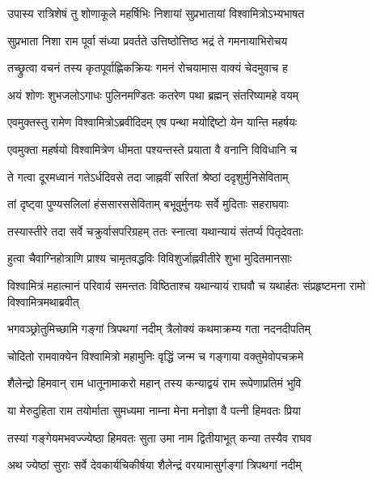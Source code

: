 
\twolineshloka
{उपास्य रात्रिशेषं तु शोणाकूले महर्षिभिः}
{निशायां सुप्रभातायां विश्वामित्रोऽभ्यभाषत} %

\twolineshloka
{सुप्रभाता निशा राम पूर्वा संध्या प्रवर्तते}
{उत्तिष्ठोत्तिष्ठ भद्रं ते गमनायाभिरोचय} %

\twolineshloka
{तच्छ्रुत्वा वचनं तस्य कृतपूर्वाह्णिकक्रियः}
{गमनं रोचयामास वाक्यं चेदमुवाच ह} %

\twolineshloka
{अयं शोणः शुभजलोऽगाधः पुलिनमण्डितः}
{कतरेण पथा ब्रह्मन् संतरिष्यामहे वयम्} %

\twolineshloka
{एवमुक्तस्तु रामेण विश्वामित्रोऽब्रवीदिदम्}
{एष पन्था मयोद्दिष्टो येन यान्ति महर्षयः} %

\twolineshloka
{एवमुक्ता महर्षयो विश्वामित्रेण धीमता}
{पश्यन्तस्ते प्रयाता वै वनानि विविधानि च} %

\twolineshloka
{ते गत्वा दूरमध्वानं गतेऽर्धदिवसे तदा}
{जाह्नवीं सरितां श्रेष्ठां ददृशुर्मुनिसेविताम्} %

\twolineshloka
{तां दृष्ट्वा पुण्यसलिलां हंससारससेविताम्}
{बभूवुर्मुनयः सर्वे मुदिताः सहराघवाः} %

\twolineshloka
{तस्यास्तीरे तदा सर्वे चक्रुर्वासपरिग्रहम्}
{ततः स्नात्वा यथान्यायं संतर्प्य पितृदेवताः} %

\twolineshloka
{हुत्वा चैवाग्निहोत्राणि प्राश्य चामृतवद्धविः}
{विविशुर्जाह्नवीतीरे शुभा मुदितमानसाः} %

\threelineshloka
{विश्वामित्रं महात्मानं परिवार्य समन्ततः}
{विष्ठिताश्च यथान्यायं राघवौ च यथार्हतः}
{संप्रहृष्टमना रामो विश्वामित्रमथाब्रवीत्} %

\twolineshloka
{भगवञ्छ्रोतुमिच्छामि गङ्गां त्रिपथगां नदीम्}
{त्रैलोक्यं कथमाक्रम्य गता नदनदीपतिम्} %

\twolineshloka
{चोदितो रामवाक्येन विश्वामित्रो महामुनिः}
{वृद्धिं जन्म च गङ्गाया वक्तुमेवोपचक्रमे} %

\twolineshloka
{शैलेन्द्रो हिमवान् राम धातूनामाकरो महान्}
{तस्य कन्याद्वयं राम रूपेणाप्रतिमं भुवि} %

\twolineshloka
{या मेरुदुहिता राम तयोर्माता सुमध्यमा}
{नाम्ना मेना मनोज्ञा वै पत्नी हिमवतः प्रिया} %

\twolineshloka
{तस्यां गङ्गेयमभवज्ज्येष्ठा हिमवतः सुता}
{उमा नाम द्वितीयाभूत् कन्या तस्यैव राघव} %

\twolineshloka
{अथ ज्येष्ठां सुराः सर्वे देवकार्यचिकीर्षया}
{शैलेन्द्रं वरयामासुर्गङ्गां त्रिपथगां नदीम्} %

